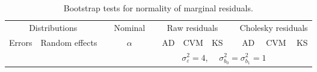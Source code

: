 \begin{table}[ht]
\begin{scriptsize}
\begin{tabular}{ll p{.1cm} c p{.1cm} rrr p{.1cm} rrr p{.1cm} rrr}
   \hline
\end{tabular}
\end{scriptsize}
\end{table}


\begin{table}[ht]
\centering
\caption{\label{tab:bootmarginal}Bootstrap tests for normality of marginal residuals.}
\begin{scriptsize}
\begin{tabular}{ll p{.1cm} c p{.1cm} rrr p{.1cm} rrr}
  \hline
  \multicolumn{2}{c}{Distributions}& & Nominal & &  \multicolumn{3}{c}{Raw residuals} & & \multicolumn{3}{c}{Cholesky residuals} \\ \cline{1-2} \cline{6-8} \cline{10-12}
  Errors & Random effects & & $\alpha$ & & AD & CVM & KS & & AD & CVM & KS \\ 
   \hline
& && && \multicolumn{6}{c}{$\sigma_{\varepsilon}^2 = 4$, \ \ $\sigma_{b_0}^2 = \sigma_{b_1}^2 = 1$} \\ \cline{6-12}


\end{tabular}
\end{scriptsize}
\end{table}
